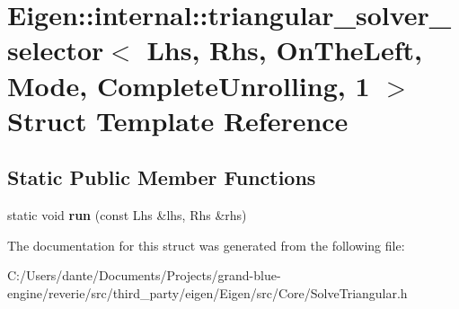 \hypertarget{struct_eigen_1_1internal_1_1triangular__solver__selector_3_01_lhs_00_01_rhs_00_01_on_the_left_00d738951dca8e27ae91ede40ea882f73c}{}\section{Eigen\+::internal\+::triangular\+\_\+solver\+\_\+selector$<$ Lhs, Rhs, On\+The\+Left, Mode, Complete\+Unrolling, 1 $>$ Struct Template Reference}
\label{struct_eigen_1_1internal_1_1triangular__solver__selector_3_01_lhs_00_01_rhs_00_01_on_the_left_00d738951dca8e27ae91ede40ea882f73c}
\subsection*{Static Public Member Functions}
\begin{DoxyCompactItemize}
\item 
\mbox{\label{struct_eigen_1_1internal_1_1triangular__solver__selector_3_01_lhs_00_01_rhs_00_01_on_the_left_00d738951dca8e27ae91ede40ea882f73c_a771e7542b3f8ed0a55978e7524624655}} 
static void {\bfseries run} (const Lhs \&lhs, Rhs \&rhs)
\end{DoxyCompactItemize}


The documentation for this struct was generated from the following file\+:\begin{DoxyCompactItemize}
\item 
C\+:/\+Users/dante/\+Documents/\+Projects/grand-\/blue-\/engine/reverie/src/third\+\_\+party/eigen/\+Eigen/src/\+Core/Solve\+Triangular.\+h\end{DoxyCompactItemize}
